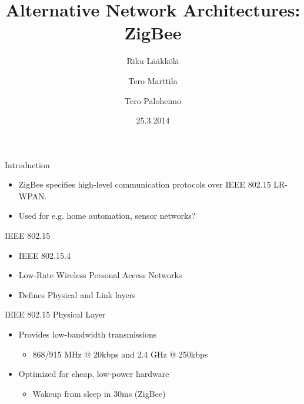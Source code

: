 \documentclass{beamer}
\title[ZigBee]{Alternative Network Architectures: ZigBee}
\author{Riku Lääkkölä \and Tero Marttila \and Tero Paloheimo}
\institute{Aalto ELEC}
\date{25.3.2014}
\begin{document}
\begin{frame}
  	\titlepage
\end{frame}


\begin{frame}{Introduction}
  \begin{itemize}
    \item ZigBee specifies high-level communication protocols over IEEE 802.15 LR-WPAN.
    \item Used for e.g. home automation, sensor networks?
  \end{itemize}
\end{frame}

\begin{frame}{IEEE 802.15}
  \begin{itemize}
  	\item IEEE 802.15.4
  	\item Low-Rate Wireless Personal Access Networks
	\item Defines Physical and Link layers
  	
  \end{itemize}
\end{frame}

\begin{frame}{IEEE 802.15 Physical Layer}
  \begin{itemize}
  	\item Provides low-bandwidth transmissions
  	\begin{itemize}
  		\item 868/915 MHz @ 20kbps and 2.4 GHz @ 250kbps
  	\end{itemize}
  	\item Optimized for cheap, low-power hardware
  	\begin{itemize}
    	\item Wakeup from sleep in 30ms (ZigBee)
  	\end{itemize}
  \end{itemize}
\end{frame}
    
\end{document}
